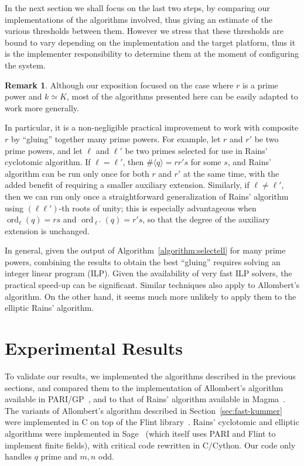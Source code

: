 \documentclass[12pt]{article}
\theoremstyle{plain}
\theoremstyle{definition}
\newtheorem*{remark}{Remark}
\DeclareMathOperator{\order}{ord} %
\newcounter{algorithm}
\begin{document}
In the next section we shall focus on the last two steps, by comparing
our implementations of the
algorithms involved, thus giving an estimate of the various thresholds
between them.  However we stress that these thresholds are bound to
vary depending on the implementation and the target platform, thus it
is the implementer responsibility to determine them at the moment of
configuring the system.

\begin{remark}
  Although our exposition focused on the case where $r$ is a prime
  power and $k\simeq K$, most of the algorithms presented here can be
  easily adapted to work more generally.

  In particular, it is a non-negligible practical improvement to work
  with composite $r$ by ``gluing'' together many prime powers. For
  example, let $r$ and $r'$ be two prime powers, and let $\ell$ and
  $\ell'$ be two primes selected for use in Rains' cyclotomic
  algorithm. If $\ell=\ell'$, then $\#\langle q\rangle=rr's$ for some
  $s$, and Rains' algorithm can be run only once for both $r$ and $r'$
  at the same time, with the added benefit of requiring a smaller
  auxiliary extension. Similarly, if $\ell\ne\ell'$, then we can run
  only once a straightforward generalization of Rains' algorithm using
  $(\ell\ell')$-th roots of unity; this is especially advantageous
  when $\order_\ell(q) = rs$ and $\order_{\ell'}(q) = r's$, so that
  the degree of the auxiliary extension is unchanged.

  In general, given the output of Algorithm~\ref{algorithm:selectell} for
  many prime powers, combining the results to obtain the best
  ``gluing'' requires solving an integer linear program (ILP). Given
  the availability of very fast ILP solvers, the practical speed-up
  can be significant.  Similar techniques also apply to Allombert's
  algorithm. On the other hand, it seems much more unlikely to apply
  them to the elliptic Rains' algorithm.
\end{remark}



\section{Experimental Results}
\label{sec:experimental-results}

To validate our results, we implemented the algorithms described in
the previous sections, and compared them to the implementation of
Allombert's algorithm available in PARI/GP~\cite{Pari}, and to that of
Rains' algorithm available in Magma~\cite{MAGMA}. %
The variants of Allombert's algorithm described in
Section~\ref{sec:fast-kummer} were implemented in C on top of the
Flint library~\cite{hart2010flint}. Rains' cyclotomic and elliptic
algorithms were implemented in Sage~\cite{Sage} (which itself uses
PARI and Flint to implement finite fields), with critical code
rewritten in C/Cython.  Our code only handles $q$ prime and $m,n$ odd.
\end{document}
